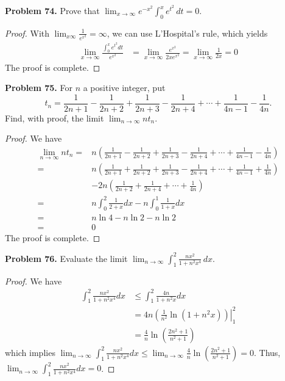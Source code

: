 \documentclass[12pt,leqno]{amsart}
\begin{document}
\medskip

\noindent
{\bf Problem 74.}
Prove that $\displaystyle\lim_{x\to\infty}e^{-x^2}\int_0^x e^{t^2}\, dt = 0$.
\begin{proof}
With $\lim_{x\infty}\frac{1}{e^{x^2}} = \infty$, we can use L'Hospital's rule, which yields
\begin{align*}
    \lim_{x\to\infty}\frac{\int_0^x e^{t^2} dt}{e^{x^2}} & = \lim_{x\to\infty}\frac{e^{x^2}}{2x e^{x^2}} = \lim_{x\to\infty}\frac{1}{2x} = 0
\end{align*}
The proof is complete.
\end{proof}

\medskip

\noindent
{\bf Problem 75.}
For $n$ a positive integer, put
$$
t_n=\frac{1}{2n+1}-\frac{1}{2n+2}+\frac{1}{2n+3}-\frac{1}{2n+4}+\cdots+\frac{1}{4n-1}-\frac{1}{4n}.
$$
Find, with proof, the limit $\lim_{n\to\infty} nt_n$.
\begin{proof}
We have 
\begin{align*}
    \lim_{n\to\infty}nt_n = & n \left(\frac{1}{2n+1}-\frac{1}{2n+2}+\frac{1}{2n+3}-\frac{1}{2n+4}+\cdots+\frac{1}{4n-1}-\frac{1}{4n} \right) \\
    = & n \left(\frac{1}{2n+1}+\frac{1}{2n+2}+\frac{1}{2n+3}-\frac{1}{2n+4}+\cdots+\frac{1}{4n-1}+\frac{1}{4n} \right)\\
    & - 2n \left(\frac{1}{2n+2} + \frac{1}{2n+4} + \cdots + \frac{1}{4n}\right) \\
    = & n \int_0^2 \frac{1}{2+x}dx - n \int^1_0 \frac{1}{1+x}dx \\
    = & n\ln 4 - n\ln 2 - n\ln 2 \\
    = & 0
\end{align*}
The proof is complete.
\end{proof}

\medskip

\noindent
{\bf Problem 76.}
Evaluate the limit $\displaystyle\lim_{n\to\infty}\int_1^2\frac{nx^2}{1+n^2x^4}\, dx$.
\begin{proof}
We have 
\begin{align*}
    \int_1^2\frac{nx^2}{1+n^2x^4} dx & \leq \int_1^2\frac{4n}{1+n^2x} dx \\
    & = 4n \left. \left(\frac{1}{n^2}\ln(1+n^2x) \right) \right|_1^2 \\
    & = \frac{4}{n} \ln \left(\frac{2n^2 + 1}{n^2 + 1}\right)
\end{align*}
which implies $\lim_{n\to\infty}\int_1^2\frac{nx^2}{1+n^2x^4} dx \leq \lim_{n\to\infty}\frac{4}{n} \ln \left(\frac{2n^2 + 1}{n^2 + 1}\right) = 0$. Thus,  $\lim_{n\to\infty} \int_1^2\frac{nx^2}{1+n^2x^4} dx = 0$.
\end{proof}
\end{document}
